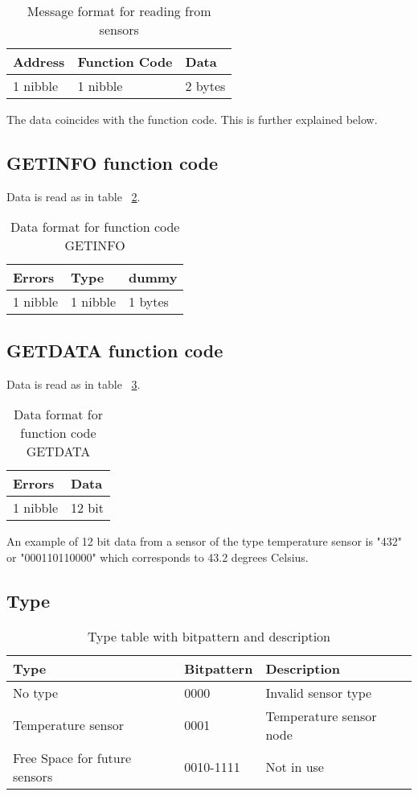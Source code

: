 \begin{table}[H]
\centering
\begin{tabular}{|l|l|l|}
	\hline
	Address & Function Code & Data \\ \hline
	1 nibble & 1 nibble	& 2 bytes \\
	\hline
\end{tabular}
\caption{Message format for reading from sensors }
\label{table:stdmsgfromsensor}
\end{table}
The data coincides with the function code. This is further explained below.

\subsection{GETINFO function code}
Data is read as in table ~\ref{table:Datagetinfo}.
\begin{table}[H]
\centering
\begin{tabular}{|l|l|l|}
	\hline
	Errors & Type & dummy \\ \hline
	1 nibble & 1 nibble	& 1 bytes \\
	\hline
\end{tabular}
\caption{Data format for function code GETINFO }
\label{table:Datagetinfo}
\end{table}
\subsection{GETDATA function code}
Data is read as in table ~\ref{table:Datagetdata}.
\begin{table}[H]
\centering
\begin{tabular}{|l|l|}
	\hline
	Errors & Data \\ \hline
	1 nibble & 12 bit \\
	\hline
\end{tabular}
\caption{Data format for function code GETDATA }
\label{table:Datagetdata}
\end{table}
An example of 12 bit data from a sensor of the type temperature sensor is "432" or "000110110000" which corresponds to 43.2 degrees Celsius.

\subsection{Type}
\begin{table}[H]
\centering
\begin{tabular}{|l|l|l|}
	\hline
	Type & Bitpattern & Description \\ 
	\hline
	No type 	& 0000 & Invalid sensor type \\
	\hline
	Temperature sensor & 0001 & Temperature sensor node \\
	\hline
	Free Space for future sensors & 0010-1111 & Not in use \\ \hline
	
\end{tabular}
\caption{Type table with bitpattern and description}
\label{table:typetable}
\end{table}

